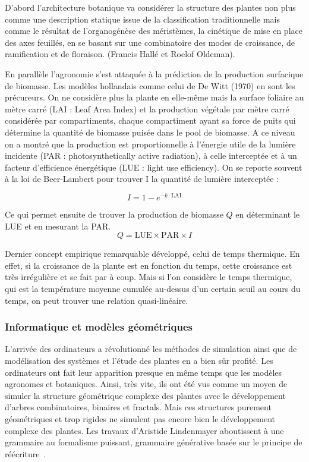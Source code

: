 D’abord l’architecture botanique va considérer la structure des plantes non plus comme une description statique issue de la classification traditionnelle mais comme le résultat de l’organogénèse des méristèmes, la cinétique de mise en place des axes feuillés, en se basant sur une combinatoire des modes de croissance, de ramification et de floraison. (Francis Hallé et Roelof Oldeman).

En parallèle l’agronomie s’est attaquée à la prédiction de la production surfacique de biomasse. Les modèles hollandais comme celui de De Witt (1970) en sont les précureurs. On ne considère plus la plante en elle-même mais la surface foliaire au mètre carré (LAI : Leaf Area Index) et la production végétale par mètre carré considérée par compartiments, chaque compartiment ayant sa force de puits qui détermine la quantité de biomasse puisée dans le pool de biomasse. A ce niveau on a montré que la production est proportionnelle à l’énergie utile de la lumière incidente (PAR : photosynthetically active radiation), à celle interceptée et à un facteur d’efficience énergétique (LUE : light use efficiency). On se reporte souvent à la loi de Beer-Lambert pour trouver I la quantité de lumière interceptée : 

\[ I = 1-e^{-k\cdot\mathrm{LAI}} \]

Ce qui permet ensuite de trouver la production de biomasse $Q$
en déterminant le LUE et en mesurant la PAR.
\[ 
  Q = \mathrm{LUE}\times\mathrm{PAR}\times I 
\]

Dernier concept empirique remarquable développé, celui de temps thermique. En effet, si la croissance de la plante est en fonction du temps, cette croissance est très irrégulière et se fait par à coup. Mais si l’on considère le temps thermique, qui est la température moyenne cumulée au-dessus d’un certain seuil au cours du temps, on peut trouver une relation quasi-linéaire.

\subsubsection{Informatique et modèles géométriques}

L’arrivée des ordinateurs a révolutionné les méthodes de simulation ainsi que
de modélisation des systèmes et l’étude des plantes en a bien sûr profité.
Les ordinateurs ont fait leur apparition presque en même temps que les
modèles agronomes et botaniques. Ainsi, très vite, ils ont été vus comme un
moyen de simuler la structure géométrique complexe des plantes avec le
développement d’arbres combinatoires, binaires et fractals. 
Mais ces structures purement géométriques et trop rigides ne simulent pas
encore bien le développement complexe des plantes.
Les travaux d’Aristide Lindenmayer aboutissent à une grammaire au formalisme
puissant, grammaire générative basée sur le principe de
réécriture~\cite{LSystem}.

